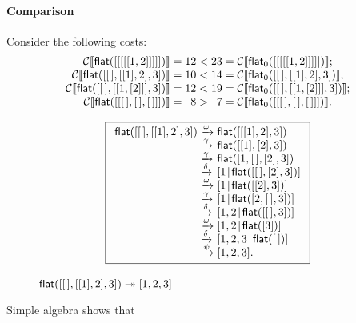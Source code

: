 \paragraph{Comparison}

Consider the following costs:
\begin{equation*}
\begin{array}{@{}r@{\;}c@{\;}r@{\;}c@{\;}r@{\;}c@{\;}l@{}}
\Call{\fun{flat}([[[[[1,2]]]]])}
  &=& 12 &<& 23 &=& \Call{\fun{flat\(_0\)}([[[[[1,2]]]]])};\\
\Call{\fun{flat}([\el,[[1],2],3])}
  &=& 10 &<& 14 &=& \Call{\fun{flat\(_0\)}([\el,[[1],2],3])};\\
\Call{\fun{flat}([\el,[[1,[2]]],3])}
  &=& 12 &<& 19 &=& \Call{\fun{flat\(_0\)}([\el,[[1,[2]]],3])};\\
\Call{\fun{flat}([[\el,\el,\el]])}
  &=&  8 &>&  7 &=& \Call{\fun{flat\(_0\)}([[\el,\el,\el]])}.
\end{array}
\end{equation*}
\begin{figure}
\begin{equation*}
\boxed{%
\begin{array}{r@{\;}l@{\;}l}
\fun{flat}([\el,[[1],2],3])
& \xrightarrow{\smash{\omega}} & \fun{flat}([[[1],2],3])\\
& \xrightarrow{\smash{\gamma}} & \fun{flat}([[1],[2],3])\\
& \xrightarrow{\smash{\gamma}} & \fun{flat}([1,\el,[2],3])\\
& \xrightarrow{\smash{\delta}} & \cons{1}{\fun{flat}([\el,[2],3])}\\
& \xrightarrow{\smash{\omega}} & \cons{1}{\fun{flat}([[2],3])}\\
& \xrightarrow{\smash{\gamma}} & \cons{1}{\fun{flat}([2,\el,3])}\\
& \xrightarrow{\smash{\delta}} & \cons{1,2}{\fun{flat}([\el,3])}\\
& \xrightarrow{\smash{\omega}} & \cons{1,2}{\fun{flat}([3])}\\
& \xrightarrow{\smash{\delta}} & \cons{1,2,3}{\fun{flat}(\el)}\\
& \xrightarrow{\smash{\psi}}   & [1,2,3].
\end{array}}
\end{equation*}
\caption{\(\textsf{flat}([[\,],[[1],2],3]) \twoheadrightarrow [1,2,3]\)}
\label{fig:flat_ex}
\end{figure}
Simple algebra shows that
